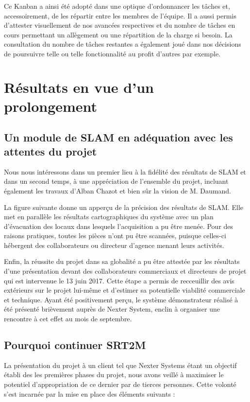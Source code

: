   Ce Kanban a ainsi été adopté dans une optique d'ordonnancer les tâches et, accessoirement, de les répartir entre les membres de l'équipe. 
  Il a aussi permis d'attester visuellement de nos avancées respectives et du nombre de tâches en cours permettant un allègement ou une répartition de la charge si besoin.
  La consultation du nombre de tâches restantes a également joué dans nos décisions de poursuivre telle ou telle fonctionnalité au profit d'autres par exemple. 
  
\section{Résultats en vue d'un prolongement}  
  \subsection{Un module de SLAM en adéquation avec les attentes du projet}
  
  Nous nous intéressons dans un premier lieu à la fidélité des résultats de SLAM et dans un second temps, à une appréciation de l'ensemble du projet, incluant également les travaux d'Alban Chazot et bien sûr la vision de M. Daumand.  
  
  La figure suivante donne un apperçu de la précision des résultats de SLAM. 
  Elle met en parallèle les résultats cartographiques du système avec un plan d'évacuation des locaux dans lesquels l'acquisition a pu être menée. 
  Pour des raisons pratiques, toutes les pièces n'ont pu être scannées, puisque celles-ci hébergent des collaborateurs ou directeur d'agence menant leurs activités. 
  
  
  Enfin, la réussite du projet dans sa globalité a pu être attestée par les résultats d'une présentation devant des collaborateurs commerciaux et directeurs de projet qui est intervenue le 13 juin 2017.
  Cette étape a permis de recceuillir des avis extérieurs sur le projet lui-même et d'estimer sa potentielle viabilité commerciale et technique. 
  Ayant été positivement perçu, le système démonstrateur réalisé à été présenté brièvement auprès de Nexter System, enclin à organiser une rencontre à cet effet au mois de septembre. 
  
  
  \subsection{Pourquoi continuer SRT2M}
  
  La présentation du projet à un client tel que Nexter Systems étant un objectif établi des les premières phases du projet, nous avons veillé à maximiser le potentiel d'appropriation de ce dernier par de tierces personnes.
  Cette volonté s'est incarnée par la mise en place des éléments suivants : 
  
